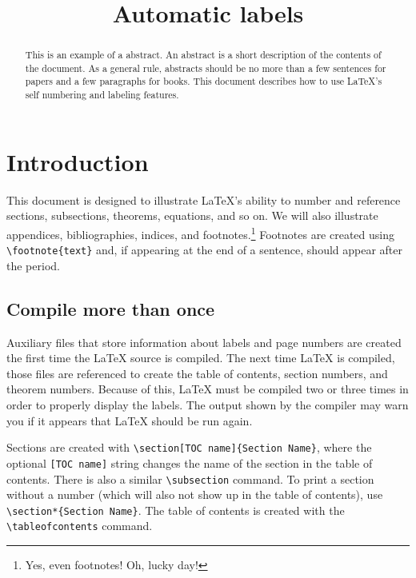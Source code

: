 \documentclass{article}
\title{Automatic labels}
\date{}
\begin{document}
\maketitle

\begin{abstract}
  This is an example of a abstract.   An abstract is a short description
  of the contents of the document.  As a general rule, abstracts should be no more than a
  few sentences for papers and a few paragraphs for books.  This document describes how to
  use \LaTeX{'s} self numbering and labeling features.
\end{abstract}

\tableofcontents

\section{Introduction}

This document is designed to illustrate \LaTeX{'s} ability to number and reference
sections, subsections, theorems, equations, and so on.  We will also illustrate
appendices, bibliographies, indices, and footnotes.\footnote{Yes, even footnotes!  Oh,
  lucky day!}  Footnotes  are created using \verb~\footnote{text}~ and,
if appearing at the end of a sentence, should appear after the period.

\subsection{Compile more than once}

Auxiliary files that store information about labels and page numbers are created the first
time the \LaTeX{} source is compiled.  The next time \LaTeX{} is compiled, those files are
referenced to create the table of contents, section numbers, and theorem numbers.  Because
of this, \LaTeX{} must be compiled two or three times in order to properly display the
labels.  The output shown by the compiler may warn you if it appears that \LaTeX{} should
be run again.

Sections  are created with \verb~\section[TOC name]{Section Name}~, where
the optional \verb~[TOC name]~ string changes the name of the section in the table of
contents.  There is also a similar  \verb~\subsection~ command.  To
print a section without a number (which will also not show up in the table of contents),
use \verb~\section*{Section Name}~.  The table of contents is created with the
\verb~\tableofcontents~ command.
\end{document}
